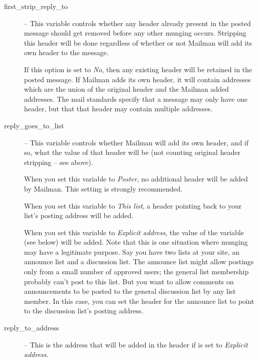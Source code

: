 \documentclass{howto}
\begin{document}
\begin{description}

\item[first_strip_reply_to] --
    This variable controls whether any  header
    already present in the posted message should get removed before
    any other munging occurs.  Stripping this header will be done
    regardless of whether or not Mailman will add its own
     header to the message.

    If this option is set to \emph{No}, then any existing
     header will be retained in the posted
    message.  If Mailman adds its own header, it will contain
    addresses which are the union of the original header and the
    Mailman added addresses.  The mail standards specify that a
    message may only have one  header, but that
    that header may contain multiple addresses.

\item[reply_goes_to_list] --
    This variable controls whether Mailman will add its own
     header, and if so, what the value of that
    header will be (not counting original header stripping -- see
    above).

    When you set this variable to \emph{Poster}, no additional
     header will be added by Mailman.  This
    setting is strongly recommended.

    When you set this variable to \emph{This list}, a
     header pointing back to your list's posting
    address will be added.

    When you set this variable to \emph{Explicit address}, the value
    of the variable  (see below) will be
    added.  Note that this is one situation where
     munging may have a legitimate purpose.  Say
    you have two lists at your site, an announce list and a discussion
    list.  The announce list might allow postings only from a small
    number of approved users; the general list membership probably
    can't post to this list.  But you want to allow comments on
    announcements to be posted to the general discussion list by any
    list member.  In this case, you can set the 
    header for the announce list to point to the discussion list's
    posting address.

\item[reply_to_address] --
    This is the address that will be added in the
     header if  is set
    to \emph{Explicit address}.

\end{description}
\end{document}
